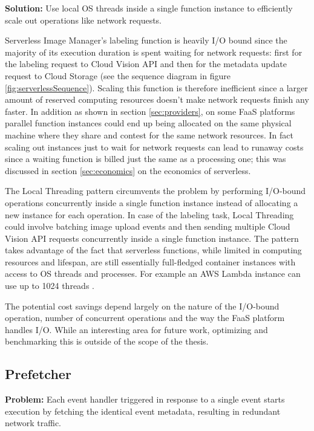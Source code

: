 
\textbf{Solution:} Use local OS threads inside a single function instance to efficiently scale out operations like network requests.

Serverless Image Manager's labeling function is heavily I/O bound since the majority of its execution duration is spent waiting for network requests: first for the labeling request to Cloud Vision API and then for the metadata update request to Cloud Storage (see the sequence diagram in figure \ref{fig:serverlessSequence}). Scaling this function is therefore inefficient since a larger amount of reserved computing resources doesn't make network requests finish any faster. In addition as shown in section \ref{sec:providers}, on some FaaS platforms parallel function instances could end up being allocated on the same physical machine where they share and contest for the same network resources. In fact scaling out instances just to wait for network requests can lead to runaway costs since a waiting function is billed just the same as a processing one; this was discussed in section \ref{sec:economics} on the economics of serverless.

The Local Threading pattern circumvents the problem by performing I/O-bound operations concurrently inside a single function instance instead of allocating a new instance for each operation. In case of the labeling task, Local Threading could involve batching image upload events and then sending multiple Cloud Vision API requests concurrently inside a single function instance. The pattern takes advantage of the fact that serverless functions, while limited in computing resources and lifespan, are still essentially full-fledged container instances with access to OS threads and processes. For example an AWS Lambda instance can use up to 1024 threads \parencite{awslambda0218}.

The potential cost savings depend largely on the nature of the I/O-bound operation, number of concurrent operations and the way the FaaS platform handles I/O. While an interesting area for future work, optimizing and benchmarking this is outside of the scope of the thesis.

\subsection{Prefetcher} \label{subsec:prefetcher}

\textbf{Problem:} Each event handler triggered in response to a single event starts execution by fetching the identical event metadata, resulting in redundant network traffic.

